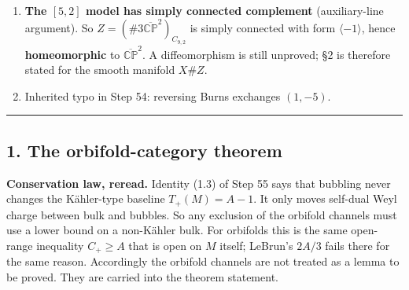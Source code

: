 \documentclass[
  10pt,
]{report}
\providecommand{\tightlist}{%
  \setlength{\itemsep}{0pt}\setlength{\parskip}{0pt}}
\begin{document}
\begin{enumerate}
  \begin{itemize}
  \item
    \begin{enumerate}
    \def\labelenumii{(\Alph{enumii})}
    \tightlist
    \item
      no cone point with nontrivial group;
    \end{enumerate}
  \item
    \begin{enumerate}
    \def\labelenumii{(\Alph{enumii})}
    \setcounter{enumii}{1}
    \tightlist
    \item
      exactly one nontrivial-group attachment region with \(b_2=1\)
      (image in \(\mathbb QE\)), all others rational balls;
    \end{enumerate}
  \item
    \begin{enumerate}
    \def\labelenumii{(\Alph{enumii})}
    \setcounter{enumii}{2}
    \tightlist
    \item
      nontrivial-group points exist and all their regions are rational
      balls. In every case the additive budget of item 3 applies.
    \end{enumerate}
  \end{itemize}
\item
  \textbf{The \([5,2]\) model has simply connected complement}
  (auxiliary-line argument). So
  \(Z=(\#3\overline{\mathbb{CP}}^2)_{C_{9,2}}\) is simply connected with
  form \(\langle-1\rangle\), hence \textbf{homeomorphic} to
  \(\overline{\mathbb{CP}}^2\). A diffeomorphism is still unproved; §2
  is therefore stated for the smooth manifold \(X\#Z\).
\item
  Inherited typo in Step 54: reversing Burns exchanges \((1,-5)\).
\end{enumerate}

\begin{center}\rule{0.5\linewidth}{0.5pt}\end{center}

\hypertarget{the-orbifold-category-theorem}{%
\subsection{1. The orbifold-category
theorem}\label{the-orbifold-category-theorem}}

\textbf{Conservation law, reread.} Identity (1.3) of Step 55 says that
bubbling never changes the Kähler-type baseline \(T_+(M)=A-1\). It only
moves self-dual Weyl charge between bulk and bubbles. So any exclusion
of the orbifold channels must use a lower bound on a non-Kähler bulk.
For orbifolds this is the same open-range inequality \(C_+\ge A\) that
is open on \(M\) itself; LeBrun's \(2A/3\) fails there for the same
reason. Accordingly the orbifold channels are not treated as a lemma to
be proved. They are carried into the theorem statement.
\end{document}
